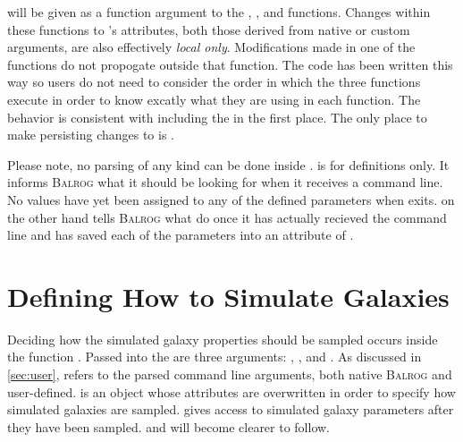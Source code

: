 \documentclass[12pt]{book}
\newcommand{\balrog}{\textsc{Balrog}}
\begin{document}
\parseargs{} will be given as a function argument to the \simfunc{}, \gspfunc, and \sexfunc{} functions.
Changes within these functions to \parseargs{}'s attributes, both those derived from native or custom arguments,
are also effectively \emph{local only}.
Modifications made in one of the functions do not propogate outside that function.
The code has been written this way so users do not need to consider the order in which the three functions execute
in order to know excatly what \parseargs{} they are using in each function.
The behavior is consistent with including the \parsefunc{} in the first place.
The only place to make persisting changes to \parseargs{} is \parsefunc{}.

Please note, no parsing of any kind can be done inside \argsfunc{}.
\argsfunc{} is for definitions only.
It informs \balrog{} what it should be looking for when it receives a command line.
No values have yet been assigned to any of the defined parameters when \argsfunc{} exits.
\parsefunc{} on the other hand tells \balrog{} what do once it has actually recieved the command line
and has saved each of the parameters into an attribute of \parseargs{}.

\section{Defining How to Simulate Galaxies}
\label{sec:simrules}

Deciding how the simulated galaxy properties should be sampled occurs inside the function \simfunc{}.
Passed into the \simfunc{} are three arguments: \simargs{}, \simrules{}, and \simsamp{}.
As discussed in \autoref{sec:user},
\simargs{} refers to the parsed command line arguments, both native \balrog{} and user-defined.
\simrules{} is an object whose attributes are overwritten
in order to specify how simulated galaxies are sampled.
\simsamp{} gives access to simulated galaxy parameters
after they have been sampled. \simrules{} and \simsamp{}
will become clearer to follow.
\end{document}
